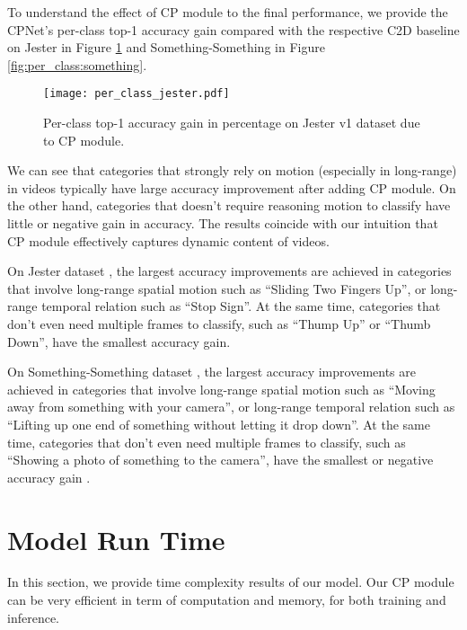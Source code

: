 \documentclass[10pt,twocolumn,letterpaper]{article}
\begin{document}
To understand the effect of CP module to the final performance, we provide the CPNet's per-class top-1 accuracy gain compared with the respective C2D baseline on Jester in Figure \ref{fig:per_class:jester} and Something-Something in Figure \ref{fig:per_class:something}.

\begin{figure}[h]
\centering
\texttt{[image: per\_class\_jester.pdf]}
\caption{Per-class top-1 accuracy gain in percentage on Jester v1 dataset due to CP module.}
\label{fig:per_class:jester}
\vspace{-2ex}
\end{figure}



We can see that categories that strongly rely on motion (especially in long-range) in videos typically have large accuracy improvement after adding CP module. On the other hand, categories that doesn't require reasoning motion to classify have little or negative gain in accuracy. The results coincide with our intuition that CP module effectively captures dynamic content of videos.

On Jester dataset \cite{Jester}, the largest accuracy improvements are achieved in categories that involve long-range spatial motion such as ``Sliding Two Fingers Up'', or long-range temporal relation such as ``Stop Sign''. At the same time, categories that don't even need multiple frames to classify, such as ``Thump Up'' or ``Thumb Down'', have the smallest accuracy gain.

On Something-Something dataset \cite{Something:Something}, the largest accuracy improvements are achieved in categories that involve long-range spatial motion such as ``Moving away from something with your camera'', or long-range temporal relation such as ``Lifting up one end of something without letting it drop down''. At the same time, categories that don't even need multiple frames to classify, such as ``Showing a photo of something to the camera'', have the smallest or negative accuracy gain .



\section{Model Run Time}
\label{sec:model:run:time}

In this section, we provide time complexity results of our model.
Our CP module can be very efficient in term of computation and memory, for both training and inference. 
\end{document}
